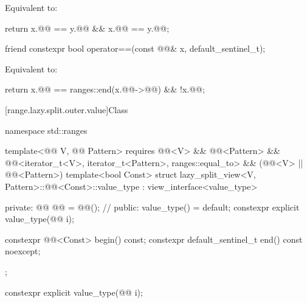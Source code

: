 \begin{itemdescr}
\pnum
\effects
Equivalent to:
\begin{codeblock}
return x.@@ == y.@@ && x.@@ == y.@@;
\end{codeblock}
\end{itemdescr}

%
\begin{itemdecl}
friend constexpr bool operator==(const @@& x, default_sentinel_t);
\end{itemdecl}

\begin{itemdescr}
\pnum
\effects
Equivalent to:
\begin{codeblock}
return x.@@ == ranges::end(x.@@->@@) && !x.@@;
\end{codeblock}
\end{itemdescr}

[range.lazy.split.outer.value]{Class }

%
\begin{codeblock}
namespace std::ranges {
  template<@@ V, @@ Pattern>
    requires @@<V> && @@<Pattern> &&
             @@<iterator_t<V>, iterator_t<Pattern>, ranges::equal_to> &&
             (@@<V> || @@<Pattern>)
  template<bool Const>
  struct lazy_split_view<V, Pattern>::@@<Const>::value_type
    : view_interface<value_type> {
  private:
    @@ @@ = @@();               // \expos
  public:
    value_type() = default;
    constexpr explicit value_type(@@ i);

    constexpr @@<Const> begin() const;
    constexpr default_sentinel_t end() const noexcept;
  };
}
\end{codeblock}

%
\begin{itemdecl}
constexpr explicit value_type(@@ i);
\end{itemdecl}

